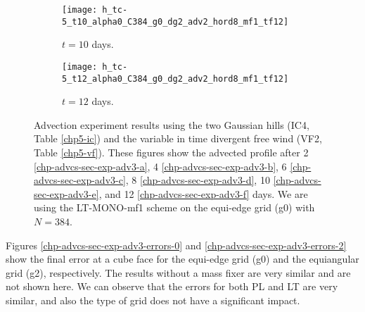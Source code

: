 \begin{figure}[!htb]
	\begin{subfigure}{0.45\textwidth}
		\centering
		\texttt{[image: h\_tc-5\_t10\_alpha0\_C384\_g0\_dg2\_adv2\_hord8\_mf1\_tf12]}
		\caption{$t=10$ days.\label{chp-advcs-sec-exp-adv3-e}}
	\end{subfigure}
	\begin{subfigure}{0.45\textwidth}
		\centering
		\texttt{[image: h\_tc-5\_t12\_alpha0\_C384\_g0\_dg2\_adv2\_hord8\_mf1\_tf12]}
		\caption{$t=12$ days.\label{chp-advcs-sec-exp-adv3-f}}
	\end{subfigure}
	\caption{Advection experiment results using the two Gaussian hills  (IC4, Table \ref{chp5-ic}) and 
		the variable in time divergent free wind (VF2, Table \ref{chp5-vf}).
		These figures show the advected profile after
		2 \eqref{chp-advcs-sec-exp-adv3-a}, 
		4  \eqref{chp-advcs-sec-exp-adv3-b},
		6  \eqref{chp-advcs-sec-exp-adv3-c},
		8  \eqref{chp-advcs-sec-exp-adv3-d},
		10  \eqref{chp-advcs-sec-exp-adv3-e},
		and 12  \eqref{chp-advcs-sec-exp-adv3-f} days.
		We are using the LT-MONO-mf1 scheme on the equi-edge grid (g0) with $N=384$.\label{chp-advcs-sec-exp-adv3}}
\end{figure}

\newpage
Figures \ref{chp-advcs-sec-exp-adv3-errors-0} and \ref{chp-advcs-sec-exp-adv3-errors-2} show 
the final error at a cube face for the equi-edge grid (g0) and the equiangular grid (g2), respectively.
The results without a mass fixer are very similar and are not shown here. 
We can observe that the errors for both PL and LT are very similar, and also the type of grid does not have a significant impact.


